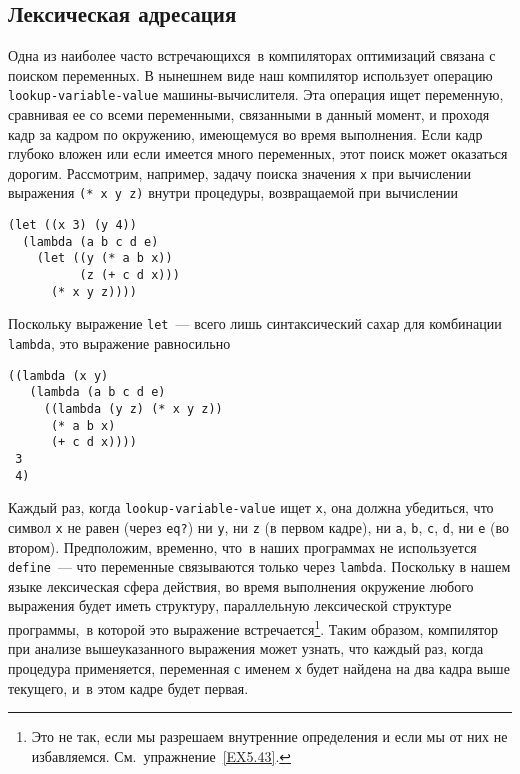 \subsection{Лексическая адресация}
\label{LEXICAL-ADDRESSING}


%
%
Одна из наиболее часто встречающихся~в компиляторах
оптимизаций связана с поиском переменных.  В нынешнем виде наш
компилятор использует операцию
{\tt lookup-variable-value} машины-вычислителя.  Эта операция
ищет переменную, сравнивая ее со всеми переменными, связанными в
данный момент, и проходя кадр за кадром по окружению, имеющемуся во
время выполнения.  Если кадр глубоко вложен или если имеется много
переменных, этот поиск может оказаться дорогим.  Рассмотрим, например,
задачу поиска значения {\tt x} при вычислении выражения
{\tt (* x y z)} внутри процедуры, возвращаемой при вычислении

\begin{Verbatim}[fontsize=\small]
(let ((x 3) (y 4))
  (lambda (a b c d e)
    (let ((y (* a b x))
          (z (+ c d x)))
      (* x y z))))
\end{Verbatim}
Поскольку выражение {\tt let}~--- всего лишь синтаксический
сахар для комбинации {\tt lambda}, это выражение равносильно

\begin{Verbatim}[fontsize=\small]
((lambda (x y)
   (lambda (a b c d e)
     ((lambda (y z) (* x y z))
      (* a b x)
      (+ c d x))))
 3
 4)
\end{Verbatim}
Каждый раз, когда {\tt lookup-variable-value} ищет
{\tt x}, она должна убедиться, что символ {\tt x} не
равен (через {\tt eq?}) ни {\tt y}, ни {\tt z} (в
первом кадре), ни {\tt a}, {\tt b}, {\tt c},
{\tt d}, ни {\tt e} (во втором).  Предположим, временно,
что~в наших программах не используется {\tt define}~--- что
переменные связываются только через {\tt lambda}.  Поскольку в
нашем языке лексическая сфера действия, во время выполнения окружение
любого выражения будет иметь структуру, параллельную лексической
структуре программы,~в которой это выражение встречается\footnote{Это не так, если мы разрешаем внутренние определения
и если мы от них не избавляемся. См.~упражнение~\ref{EX5.43}.
}.
Таким образом, компилятор при анализе вышеуказанного
выражения может узнать, что каждый раз, когда процедура применяется,
переменная с именем 
{\tt x} будет найдена на два кадра выше текущего, и~в этом
кадре будет первая.

